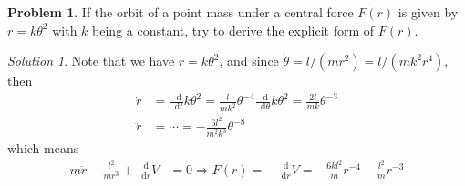 \documentclass[twoside,11pt]{article}
\newcommand{\lms}{\fontfamily{lmss}\selectfont} %
\renewcommand*\d{\mathop{}\!\mathrm{d}}
\theoremstyle{definition}
\newtheorem{problem}{\lms Problem}
\theoremstyle{remark}
\newtheorem*{solution}{\lms Solution}
\begin{document}
\begin{problem}
If the orbit of a point mass under a central force $F(r)$ is given by $r = k\theta^2$ with
$k$ being a constant, try to derive the explicit form of $F(r)$.
\end{problem}
\begin{solution}
Note that we have $r=k\theta^2$, and since $\dot\theta = l/(mr^2) = l/(mk^2r^4)$, then
\begin{align*}
    \dot r &= 
    \frac{\d}{\d t}k\theta^2 = \frac{l}{mk^2}\theta^{-4}\frac{\d}{\d\theta}k\theta^2
    = \frac{2l}{mk}\theta^{-3}\\
    \ddot r &=\cdots = -\frac{6l^2}{m^2k^3}\theta^{-8}
\end{align*}
which means
\begin{align*}
    m\ddot r - \frac{l^2}{mr^3} + \frac{\d}{\d r}V &= 0
    \Rightarrow
    F(r) = -\frac{\d}{\d r}V = -\frac{6kl^2}{m}r^{-4} - \frac{l^2}{m}r^{-3}
\end{align*}
\end{solution}
\end{document}
